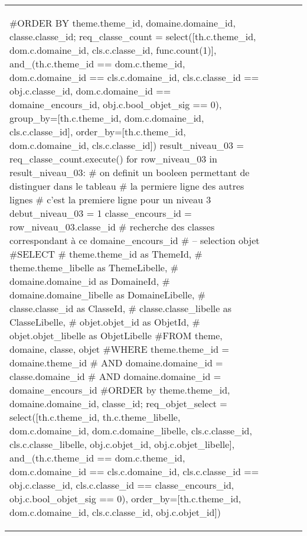\documentclass[12pt,titlepage]{book}
\begin{document}
\begin{supertabular}{|p{7.5cm}|p{7.5cm}|p{7.5cm}|c|p{10cm}|}
\begin{lbdpython}
      #ORDER BY theme.theme_id, domaine.domaine_id, classe.classe_id;
      req_classe_count = select([th.c.theme_id, dom.c.domaine_id,
                                 cls.c.classe_id, func.count(1)],
                         and_(th.c.theme_id == dom.c.theme_id,
                              dom.c.domaine_id == cls.c.domaine_id,
                              cls.c.classe_id == obj.c.classe_id,
                              dom.c.domaine_id == domaine_encours_id,
                              obj.c.bool_objet_sig == 0),
                         group_by=[th.c.theme_id, dom.c.domaine_id, cls.c.classe_id],
                         order_by=[th.c.theme_id, dom.c.domaine_id, cls.c.classe_id])
      result_niveau_03 = req_classe_count.execute()
      for row_niveau_03 in result_niveau_03:
         # on definit un booleen permettant de distinguer dans le tableau
         # la permiere ligne des autres lignes
         # c'est la premiere ligne pour un niveau 3
         debut_niveau_03 = 1
         classe_encours_id = row_niveau_03.classe_id
         # recherche des classes correspondant à ce domaine_encours_id
         # -- selection objet
         #SELECT
         #   theme.theme_id as ThemeId,
         #   theme.theme_libelle as ThemeLibelle,
         #   domaine.domaine_id as DomaineId,
         #   domaine.domaine_libelle as DomaineLibelle,
         #   classe.classe_id as ClasseId,
         #   classe.classe_libelle as ClasseLibelle,
         #   objet.objet_id as ObjetId,
         #   objet.objet_libelle as ObjetLibelle
         #FROM theme, domaine, classe, objet
         #WHERE theme.theme_id = domaine.theme_id
         #  AND domaine.domaine_id = classe.domaine_id
         #  AND domaine.domaine_id = domaine_encours_id
         #ORDER by theme.theme_id, domaine.domaine_id, classe_id;
         req_objet_select = select([th.c.theme_id, th.c.theme_libelle,
                                    dom.c.domaine_id, dom.c.domaine_libelle,
                                    cls.c.classe_id, cls.c.classe_libelle,
                                    obj.c.objet_id, obj.c.objet_libelle],
                              and_(th.c.theme_id == dom.c.theme_id,
                                   dom.c.domaine_id == cls.c.domaine_id,                              
                                   cls.c.classe_id == obj.c.classe_id,                              
                                   cls.c.classe_id == classe_encours_id,
                                   obj.c.bool_objet_sig == 0),
                              order_by=[th.c.theme_id, dom.c.domaine_id, cls.c.classe_id, obj.c.objet_id])

\end{lbdpython}
\end{supertabular}
\end{document}
